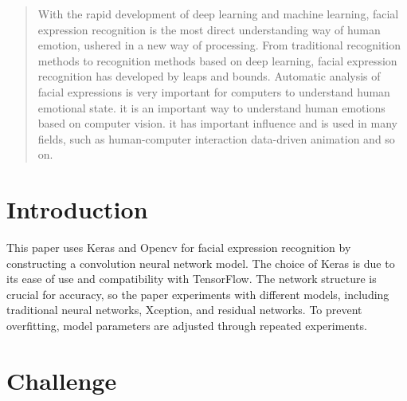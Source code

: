 \documentclass[a0,portrait]{a0poster}
\begin{document}
\begin{multicols}{2} %



\color{DarkRed}

\begin{abstract}
	With the rapid development of deep learning and machine learning, facial expression recognition is the most direct understanding way of human emotion, ushered in a new way of processing. From traditional recognition methods to recognition methods based on deep learning, facial expression recognition has developed by leaps and bounds. Automatic analysis of facial expressions is very important for computers to understand human emotional state. it is an important way to understand human emotions based on computer vision. it has important influence and is used in many fields, such as human-computer interaction data-driven animation and so on.
\end{abstract}


\color{Black}
\section*{Introduction}

\quad This paper uses Keras and Opencv for facial expression recognition by constructing a convolution neural network model. The choice of Keras is due to its ease of use and compatibility with TensorFlow. The network structure is crucial for accuracy, so the paper experiments with different models, including traditional neural networks, Xception, and residual networks. To prevent overfitting, model parameters are adjusted through repeated experiments.



\section*{Challenge}


\end{multicols}
\end{document}
